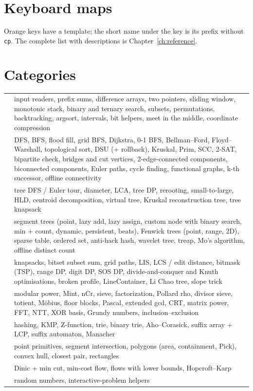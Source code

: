 \section{Keyboard maps}

Orange keys have a template; the short name under the key is its prefix without \texttt{cp}. The complete list with
descriptions is Chapter~\ref{ch:reference}.



\section{Categories}

\begin{center}
\begin{tabularx}{\linewidth}{p{3.4cm}L}
\toprule
{} &  \\
\midrule
{} & input readers, prefix sums, difference arrays, two pointers, sliding window, monotonic stack, binary and
  ternary search, subsets, permutations, backtracking, argsort, intervals, bit helpers, meet in the middle,
  coordinate compression \\
 & DFS, BFS, flood fill, grid BFS, Dijkstra, 0-1 BFS, Bellman--Ford, Floyd--Warshall, topological sort,
  DSU (+ rollback), Kruskal, Prim, SCC, 2-SAT, bipartite check, bridges and cut vertices, 2-edge-connected components,
  biconnected components, Euler paths, cycle finding, functional graphs, k-th successor, offline connectivity \\
 & tree DFS / Euler tour, diameter, LCA, tree DP, rerooting, small-to-large, HLD, centroid decomposition,
  virtual tree, Kruskal reconstruction tree, tree knapsack \\
 & segment trees (point, lazy add, lazy assign, custom node with binary search, min + count, dynamic,
  persistent, beats), Fenwick trees (point, range, 2D), sparse table, ordered set, anti-hack hash, wavelet tree,
  treap, Mo's algorithm, offline distinct count \\
 & knapsacks, bitset subset sum, grid paths, LIS, LCS / edit distance, bitmask (TSP), range DP, digit DP,
  SOS DP, divide-and-conquer and Knuth optimisations, broken profile, LineContainer, Li Chao tree, slope trick \\
 & modular power, Mint, nCr, sieve, factorization, Pollard rho, divisor sieve, totient, M\"obius,
  floor blocks, Pascal, extended gcd, CRT, matrix power, FFT, NTT, XOR basis, Grundy numbers, inclusion--exclusion \\
 & hashing, KMP, Z-function, trie, binary trie, Aho--Corasick, suffix array + LCP, suffix automaton, Manacher \\
 & point primitives, segment intersection, polygons (area, containment, Pick), convex hull, closest
  pair, rectangles \\
 & Dinic + min cut, min-cost flow, flows with lower bounds, Hopcroft--Karp \\
 & random numbers, interactive-problem helpers \\
\bottomrule
\end{tabularx}
\end{center}
